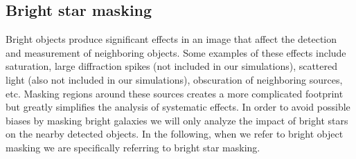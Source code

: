 \documentclass[\docopts]{\docclass}
\begin{document}
\subsection{Bright star masking}

Bright objects produce significant effects in an image that affect the detection and measurement of neighboring objects. Some examples of these effects include saturation, large diffraction spikes (not included in our simulations), scattered light (also not included in our simulations), obscuration of neighboring sources, etc. Masking regions around these sources creates a more complicated footprint but greatly simplifies the analysis of systematic effects. In order to avoid possible biases by masking bright galaxies we will only analyze the impact of bright stars on the nearby detected objects. In the following, when we refer to bright object masking we are specifically referring to bright star masking.
\end{document}

